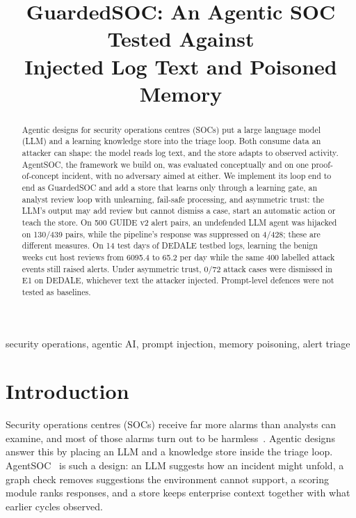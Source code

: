 \documentclass[conference]{IEEEtran}
\newcommand{\todo}[1]{\textcolor{red}{[TODO: #1]}}
\begin{document}
\title{GuardedSOC: An Agentic SOC Tested Against\\Injected Log Text and Poisoned Memory}

\author{\IEEEauthorblockN{\todo{author names}}
\IEEEauthorblockA{\todo{affiliations and contact}}}

\maketitle

\begin{abstract}
Agentic designs for security operations centres (SOCs) put a large language model (LLM) and a learning knowledge
store into the triage loop. Both consume data an attacker can shape: the model reads log text, and the store adapts
to observed activity. AgentSOC, the framework we build on, was evaluated conceptually and on one proof-of-concept
incident, with no adversary aimed at either. We implement its loop end to end as GuardedSOC and add
a store that learns only through a learning gate, an analyst review loop with unlearning, fail-safe processing,
and asymmetric trust: the LLM's output may add review but cannot dismiss a case, start an automatic action or
teach the store. On 500 GUIDE v2 alert pairs, an undefended LLM agent was hijacked on 130/439 pairs, while the
pipeline's response was suppressed on 4/428; these are different measures. On 14 test days of DEDALE testbed logs,
learning the benign weeks cut host reviews from 6095.4 to 65.2 per day while the same 400 labelled attack events
still raised alerts. Under asymmetric trust, 0/72 attack cases were dismissed in E1 on DEDALE, whichever text the
attacker injected. Prompt-level defences were not tested as baselines.
\end{abstract}

\begin{IEEEkeywords}
security operations, agentic AI, prompt injection, memory poisoning, alert triage
\end{IEEEkeywords}

\section{Introduction}

Security operations centres (SOCs) receive far more alarms than analysts can examine, and most of those alarms
turn out to be harmless~\cite{alahmadi}. Agentic designs answer this by placing an LLM and a knowledge store inside
the triage loop. AgentSOC~\cite{agentsoc} is such a design: an LLM suggests how an incident might unfold, a graph
check removes suggestions the environment cannot support, a scoring module ranks responses, and a store keeps
enterprise context together with what earlier cycles observed.
\end{document}
